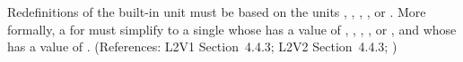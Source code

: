 Redefinitions of the built-in unit  must be based on the
units , , , , or
.  More formally, a \UnitDefinition for
 must simplify to a single \Unit whose  
has a value of , , , , or
, and whose   has a value of
.  (References: L2V1 Section~4.4.3; L2V2 Section~4.4.3; )
